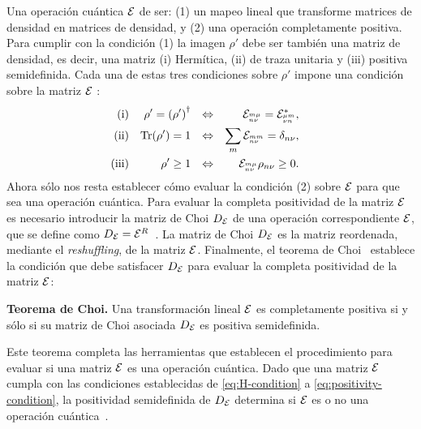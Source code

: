 Una operación cuántica $\mathcal{E}$ de ser: (1) un mapeo lineal que
transforme matrices de densidad en matrices de densidad, y (2) una 
operación completamente positiva. 
Para cumplir con la condición (1) la imagen $\rho'$ debe ser también 
una matriz de densidad, es decir, una matriz (i) Hermítica, 
(ii) de traza unitaria y (iii) positiva semidefinida. 
Cada una de estas tres condiciones sobre $\rho'$ impone una condición 
sobre la matriz $\mathcal{E}$ \cite{bengtsson_zyczkowski_2017}:
\begin{align}
\text{(i)}&& \rho'=\qty(\rho')^{\dagger}&&\Leftrightarrow
    && \mathcal{E}_{{}^{m\mu}_{n\nu}}=\mathcal{E}_{{}^{\mu m}_{\nu n}}^*,&&
    \label{eq:H-condition}\\
\text{(ii)}&&\Tr(\rho')=1
    &&\Leftrightarrow&&  \sum_{m}\mathcal{E}_{{}^{mm}_{n\nu}}=\delta_{n\nu},\\     
\text{(iii)}&&\rho'\geq1
    &&\Leftrightarrow&&  \mathcal{E}_{{}^{m\mu}_{n\nu}}\rho_{n\nu}\geq0.
    \label{eq:positivity-condition}
\end{align}
Ahora sólo nos resta establecer cómo evaluar la condición (2) sobre $\mathcal{E}$
para que sea una operación cuántica. 
Para evaluar la completa positividad de la matriz $\mathcal{E}$
es necesario introducir la matriz de Choi $D_{\mathcal{E}}$ 
de una operación correspondiente $\mathcal{E}$, que se define como 
$D_{\mathcal{E}}=\mathcal{E}^{R}$~\cite{bengtsson_zyczkowski_2017}.
La matriz de Choi $D_{\mathcal{E}}$ es la matriz reordenada, mediante
el \textit{reshuffling}, de la matriz $\mathcal{E}$. 
Finalmente, el teorema de Choi~\cite{bengtsson_zyczkowski_2017}
establece la condición que debe satisfacer $D_{\mathcal{E}}$ para 
evaluar la completa positividad de la matriz $\mathcal{E}$:
\begin{teorema}{\textbf{Teorema de Choi.}}
Una transformación lineal $\mathcal{E}$ es completamente positiva si y sólo si 
su matriz de Choi asociada $D_{\mathcal{E}}$ es positiva semidefinida.
\end{teorema}
Este teorema completa las herramientas que establecen el procedimiento 
para evaluar si una matriz $\mathcal{E}$ es una operación cuántica. 
Dado que una matriz $\mathcal{E}$ cumpla con las condiciones establecidas de
\eqref{eq:H-condition} a \eqref{eq:positivity-condition}, la positividad
semidefinida de $D_{\mathcal{E}}$ determina si $\mathcal{E}$ es 
o no una operación cuántica~\cite{bengtsson_zyczkowski_2017}.
 

